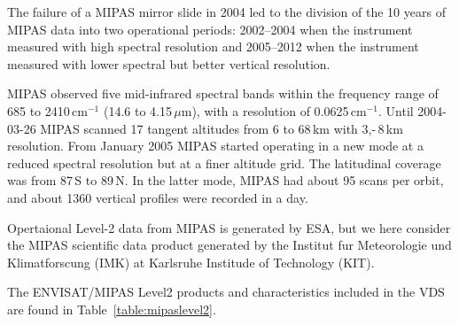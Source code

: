 The failure of a MIPAS mirror slide in 2004 led to the 
division of the 10 years of MIPAS
data into two operational periods: 2002--2004 when the 
instrument measured with high spectral resolution 
and 2005--2012 when the instrument measured with lower 
spectral but better vertical resolution.

MIPAS observed five mid-infrared spectral bands within the
frequency range of 685 to 2410\,cm\(^{-1}\) (14.6 to 4.15\,\(\mu\)m),
with a resolution of 0.0625\,cm\(^{-1}\).
Until 2004-03-26 MIPAS scanned 17 tangent altitudes from 
6 to 68\,km with 3,-\,8\,km resolution.
From January 2005 MIPAS started operating in a new mode
at a reduced spectral resolution but at a finer altitude
grid. The latitudinal coverage was from 87\degree\,S to 89\degree\,N.
In the latter mode, MIPAS had about 95 scans per orbit, and about
1360 vertical profiles were recorded in a day.

Opertaional Level-2 data from MIPAS is generated by ESA,
but we here consider the MIPAS scientific data product
generated by the Institut fur Meteorologie und Klimatforscung
(IMK) at Karlsruhe Institude of Technology (KIT).

The  ENVISAT/MIPAS Level2 products and characteristics included in the
VDS are found in Table~\ref{table:mipaslevel2}.



